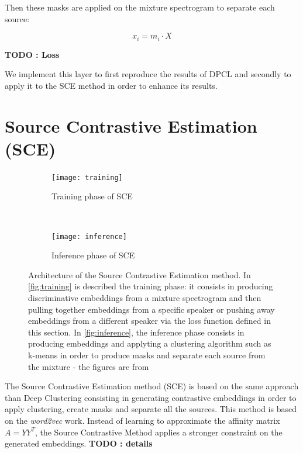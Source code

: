 \documentclass[master, tikz, final,11pt, dvipdfmx]{iscs-thesis}
\begin{document}
Then these masks are applied on the mixture spectrogram to separate each source:

\[
x_i = m_i \cdot X
\]

\textbf{TODO : Loss}

We implement this layer to first reproduce the results of DPCL \cite{DPCLV2} and secondly to apply it to the SCE method in order to enhance its results.

\section{Source Contrastive Estimation (SCE)}

\begin{figure}[h]
\centering
\begin{subfigure}[b]{\textwidth}
\texttt{[image: training]}
\captionsetup{justification=centering}
\caption{Training phase of SCE}
\label{fig:training} 
\end{subfigure}
\\
\begin{subfigure}[b]{\textwidth}
\texttt{[image: inference]}
\captionsetup{justification=centering}
\caption{Inference phase of SCE}
\label{fig:inference} 
\end{subfigure}
\caption[Architecture of SCE approach - Training and Inference phases]{ Architecture of the Source Contrastive Estimation method. In \autoref{fig:training} is described the training phase: it consists in producing discriminative embeddings from a mixture spectrogram and then pulling together embeddings from a specific speaker or pushing away embeddings from a different speaker via the loss function defined in this section. In \autoref{fig:inference}, the inference phase consists in producing embeddings and applyting a clustering algorithm such as k-means in order to produce masks and separate each source from the mixture - the figures are from \cite{SCE}}
\label{fig:sce} 

\end{figure}

The Source Contrastive Estimation method (SCE) \cite{SCE} is based on the same approach than Deep Clustering consisting in generating contrastive embeddings in order to apply clustering, create masks and separate all the sources. This method is based on the \textit{word2vec} work.
Instead of learning to approximate the affinity matrix $A = YY^{T}$, the Source Contrastive Method applies a stronger constraint on the generated embeddings. \textbf{TODO : details}
\end{document}
